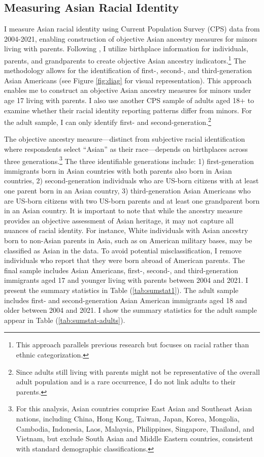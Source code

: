 \subsection{Measuring Asian Racial Identity}\label{subsec:cps}

I measure Asian racial identity using Current Population Survey (CPS) data from 2004-2021, enabling construction of objective Asian ancestry measures for minors living with parents. Following \textcite{antmanEthnicAttritionObserved2016,antmanEthnicAttritionAssimilation2020}, I utilize birthplace information for individuals, parents, and grandparents to create objective Asian ancestry indicators.\footnote{This approach parallels previous research but focuses on racial rather than ethnic categorization.} The methodology allows for the identification of first-, second-, and third-generation Asian Americans (see Figure \ref{fig:diag} for visual representation). This approach enables me to construct an objective Asian ancestry measures for minors under age 17 living with parents. I also use another CPS sample of adults aged 18+ to examine whether their racial identity reporting patterns differ from minors. For the adult sample, I can only identify first- and second-generation.\footnote{Since adults still living with parents might not be representative of the overall adult population and is a rare occurrence, I do not link adults to their parents.}

The objective ancestry measure—distinct from subjective racial identification where respondents select ``Asian'' as their race—depends on birthplaces across three generations.\footnote{For this analysis, Asian countries comprise East Asian and Southeast Asian nations, including China, Hong Kong, Taiwan, Japan, Korea, Mongolia, Cambodia, Indonesia, Laos, Malaysia, Philippines, Singapore, Thailand, and Vietnam, but exclude South Asian and Middle Eastern countries, consistent with standard demographic classifications.} The three identifiable generations include: 1) first-generation immigrants born in Asian countries with both parents also born in Asian countries, 2) second-generation individuals who are US-born citizens with at least one parent born in an Asian country, 3) third-generation Asian Americans who are US-born citizens with two US-born parents and at least one grandparent born in an Asian country. It is important to note that while the ancestry measure provides an objective assessment of Asian heritage, it may not capture all nuances of racial identity. For instance, White individuals with Asian ancestry born to non-Asian parents in Asia, such as on American military bases, may be classified as Asian in the data. To avoid potential misclassification, I remove individuals who report that they were born abroad of American parents. The final sample includes Asian Americans, first-, second-, and third-generation immigrants aged 17 and younger living with parents between 2004 and 2021. I present the summary statistics in Table (\ref{tab:sumstat1}). The adult sample includes first- and second-generation Asian American immigrants aged 18 and older between 2004 and 2021. I show the summary statistics for the adult sample appear in Table (\ref{tab:sumstat-adults}). 

